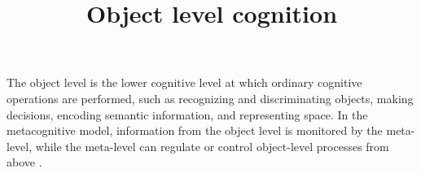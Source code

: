\documentclass[a4paper]{article}
\title{Object level cognition}
\date{}
\begin{document}
    \maketitle
    The object level is the lower cognitive level at which ordinary cognitive operations are performed, such as recognizing and discriminating objects, making decisions, encoding semantic information, and representing space. In the metacognitive model, information from the object level is monitored by the meta-level, while the meta-level can regulate or control object-level processes from above \cite{fleur-2021-metacognition-ideas-and-insights-from-neuro-and-educational-scie}.
    
    
\end{document}
